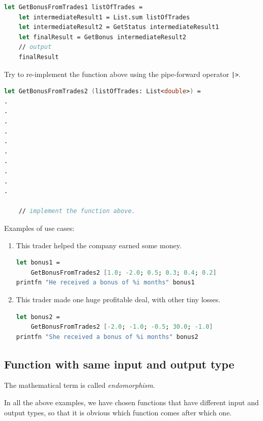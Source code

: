 \documentclass[12pt]{article}
\begin{document}
\begin{lstlisting}[language=FSharp]
let GetBonusFromTrades1 listOfTrades =
    let intermediateResult1 = List.sum listOfTrades
    let intermediateResult2 = GetStatus intermediateResult1
    let finalResult = GetBonus intermediateResult2
    // output
    finalResult
\end{lstlisting}

Try to re-implement the function above using the pipe-forward operator \texttt{|>}.
\begin{lstlisting}[language=FSharp]
let GetBonusFromTrades2 (listOfTrades: List<double>) =
.
.
.
.
.
.
.
.
.
.

    // implement the function above.
\end{lstlisting}

\vspace{1.0cm}

Examples of use cases:
\begin{enumerate}
\item This trader helped the company earned some money. 
\begin{lstlisting}[language=FSharp]
let bonus1 = 
    GetBonusFromTrades2 [1.0; -2.0; 0.5; 0.3; 0.4; 0.2]
printfn "He received a bonus of %i months" bonus1
\end{lstlisting}
\item This trader made one huge profitable deal, with other tiny losses.

\begin{lstlisting}[language=FSharp]
let bonus2 = 
    GetBonusFromTrades2 [-2.0; -1.0; -0.5; 30.0; -1.0]
printfn "She received a bonus of %i months" bonus2
\end{lstlisting}
\end{enumerate}

\subsection{Function with same input and output type}
The mathematical term is called \textit{endomorphism}. 

In all the above examples, we have chosen functions that have different input and output types, so that it is obvious which function comes after which one.
\end{document}
